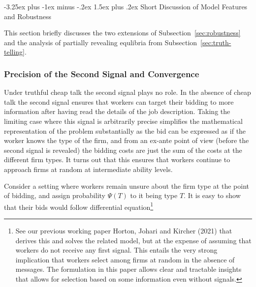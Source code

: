 \documentclass[12pt]{article}
\makeatletter
\renewcommand{\subsection}{%
  \@startsection{subsection}{2}{\z@}%
  {-3.25ex plus -1ex minus -.2ex}%
  {1.5ex plus .2ex}%
  {\normalfont\large\bfseries}%
}
\makeatother
\begin{document}
\subsection{Short Discussion of Model Features and Robustness}
\label{online_app:discussion}

This section briefly discusses the two extensions of Subsection~\ref{sec:robustness} and the analysis of partially revealing equlibria from Subsection~\ref{sec:truth-telling}. \bigskip


\subsubsection{Precision of the Second Signal and Convergence}
\label{online_app:second_signal} 


Under truthful cheap talk the second signal plays no role. In the absence of cheap talk the second signal ensures that
workers can target their bidding to more information after having read the
details of the job description. Taking the limiting case where this signal
is arbitrarily precise simplifies the mathematical representation of the
problem substantially as the bid can be expressed as if the worker knows the type of the firm, and from an ex-ante point of view (before the second signal is revealed) the bidding costs are just the sum of the costs at the different firm types. It turns out that this ensures that workers continue to approach firms at random at intermediate ability levels.

Consider a setting where workers remain unsure about the firm type at the point of
bidding, and assign probability $\Psi (T)$ to it being type $T$. It is easy
to show that their bids would follow differential equation\footnote{%
See our previous working paper Horton, Johari and Kircher (2021) that
derives this and solves the related model, but at the expense of assuming
that workers do not receive any first signal. This entails the very strong
implication that workers select among firms at random in the absence of
messages. The formulation in this paper allows clear and tractable insights
that allows for selection based on some information even without signals.} 
\end{document}
